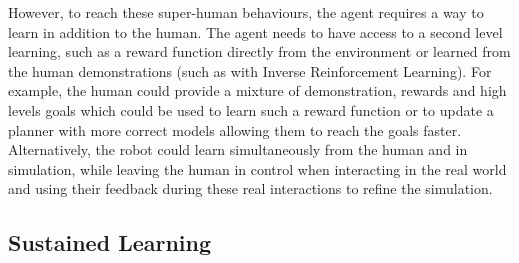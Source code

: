 


However, to reach these super-human behaviours, the agent requires a way to learn in addition to the human. The agent needs to have access to a second level learning, such as a reward function directly from the environment or learned from the human demonstrations (such as with Inverse Reinforcement Learning). For example, the human could provide a mixture of demonstration, rewards and high levels goals which could be used to learn such a reward function or to update a planner with more correct models allowing them to reach the goals faster. Alternatively, the robot could learn simultaneously from the human and in simulation, while leaving the human in control when interacting in the real world and using their feedback during these real interactions to refine the simulation.

\subsection{Sustained Learning}

